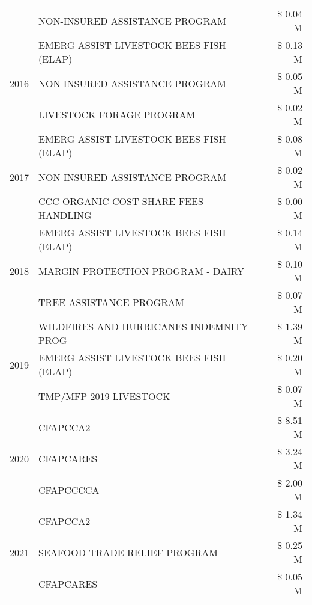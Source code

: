 \begin{tabular}{llr}
 & NON-INSURED ASSISTANCE PROGRAM & \$ 0.04 M \\
\cline{1-3}
\multirow[t]{3}{*}{2016} & EMERG ASSIST LIVESTOCK BEES FISH (ELAP)       & \$ 0.13 M \\
 & NON-INSURED ASSISTANCE PROGRAM                & \$ 0.05 M \\
 & LIVESTOCK FORAGE PROGRAM                      & \$ 0.02 M \\
\cline{1-3}
\multirow[t]{3}{*}{2017} & EMERG ASSIST LIVESTOCK BEES FISH (ELAP) & \$ 0.08 M \\
 & NON-INSURED ASSISTANCE PROGRAM & \$ 0.02 M \\
 & CCC ORGANIC COST SHARE FEES - HANDLING & \$ 0.00 M \\
\cline{1-3}
\multirow[t]{3}{*}{2018} & EMERG ASSIST LIVESTOCK BEES FISH (ELAP) & \$ 0.14 M \\
 & MARGIN PROTECTION PROGRAM - DAIRY & \$ 0.10 M \\
 & TREE ASSISTANCE PROGRAM & \$ 0.07 M \\
\cline{1-3}
\multirow[t]{3}{*}{2019} & WILDFIRES AND HURRICANES INDEMNITY PROG & \$ 1.39 M \\
 & EMERG ASSIST LIVESTOCK BEES FISH (ELAP) & \$ 0.20 M \\
 & TMP/MFP 2019 LIVESTOCK & \$ 0.07 M \\
\cline{1-3}
\multirow[t]{3}{*}{2020} & CFAPCCA2 & \$ 8.51 M \\
 & CFAPCARES & \$ 3.24 M \\
 & CFAPCCCCA & \$ 2.00 M \\
\cline{1-3}
\multirow[t]{3}{*}{2021} & CFAPCCA2 & \$ 1.34 M \\
 & SEAFOOD TRADE RELIEF PROGRAM & \$ 0.25 M \\
 & CFAPCARES & \$ 0.05 M \\
\cline{1-3}
\bottomrule
\end{tabular}
